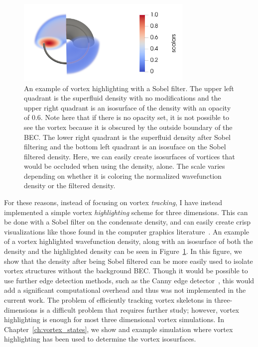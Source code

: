 \begin{figure}
\center \includegraphics[width=0.75\textwidth]{data/gpu/vortex_highlighting/all.png}
\caption{
An example of vortex highlighting with a Sobel filter.
The upper left quadrant is the superfluid density with no modifications and the upper right quadrant is an isosurface of the density with an opacity of 0.6.
Note here that if there is no opacity set, it is not possible to see the vortex because it is obscured by the outside boundary of the BEC.
The lower right quadrant is the superfluid density after Sobel filtering and the bottom left quadrant is an isosuface on the Sobel filtered density.
Here, we can easily create isosurfaces of vortices that would be occluded when using the density, alone.
The scale varies depending on whether it is coloring the normalized wavefunction density or the filtered density.
}
\label{fig:highlight}
\end{figure}

For these reasons, instead of focusing on vortex \textit{tracking}, I have instead implemented a simple vortex \textit{highlighting} scheme for three dimensions.
This can be done with a Sobel filter on the condensate density, and can easily create crisp visualizations like those found in the computer graphics literature~\cite{guo2018}.
An example of a vortex highlighted wavefunction density, along with an isosurface of both the density and the highlighted density can be seen in Figure~\ref{fig:highlight}.
In this figure, we show that the density after being Sobel filtered can be more easily used to isolate vortex structures without the background BEC.
Though it would be possible to use further edge detection methods, such as the Canny edge detector~\cite{canny1986}, this would add a significant computational overhead and thus was not implemented in the current work.
The problem of efficiently tracking vortex skeletons in three-dimensions is a difficult problem that requires further study; however, vortex highlighting is enough for most three dimensional vortex simulations.
In Chapter~\ref{ch:vortex_states}, we show and example simulation where vortex highlighting has been used to determine the vortex isosurfaces.

